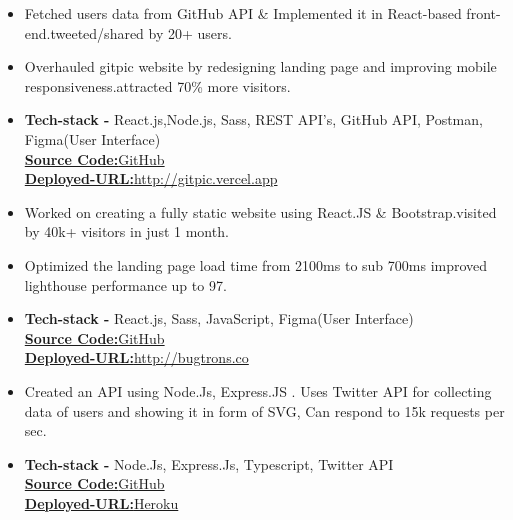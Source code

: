 \documentclass[10pt,a4paper,ragged2e]{altacv}
\begin{document}
\begin{itemize}
\item Fetched users data from GitHub API \& Implemented it in React-based front-end.tweeted/shared by 20+ users.
\item Overhauled gitpic website by redesigning landing page and improving mobile responsiveness.attracted 70\% more visitors.
\item \textbf{Tech-stack -} React.js,Node.js, Sass, REST API's,  GitHub API, Postman, Figma(User Interface)
\\
 \href{https://github.com/ghulamyazdani/Gitpic}{\textbf{Source Code:}GitHub}
 \\
 \href{http://gitpic.vercel.app}{\textbf{Deployed-URL:}http://gitpic.vercel.app}

\end{itemize}
\smallskip
{}
\begin{itemize}
\item Worked on creating a fully static website using React.JS \& Bootstrap.visited by 40k+ visitors in just 1 month.
\item Optimized the landing page load time from 2100ms to sub 700ms improved lighthouse performance up to 97.
\item \textbf{Tech-stack -} React.js, Sass, JavaScript, Figma(User Interface)
\\
 \href{https://github.com/ghulamyazdani/bugtrons.co}{\textbf{Source Code:}GitHub}
 \\
 \href{http://bugtrons.co}{\textbf{Deployed-URL:}http://bugtrons.co}

\end{itemize}
\smallskip
{}
\begin{itemize}
\item Created an API using Node.Js, Express.JS . Uses Twitter API for collecting data of users and showing it in form of SVG, Can respond to 15k requests per sec.
\item \textbf{Tech-stack -} Node.Js, Express.Js, Typescript, Twitter API
\\
 \href{https://github.com/ghulamyazdani/tweetup}{\textbf{Source Code:}GitHub}
 \\
 \href{https://tweerup.herokuapp.com/tweet?username=iamyazreza}{\textbf{Deployed-URL:}Heroku}

\end{itemize}
\smallskip
\end{document}
